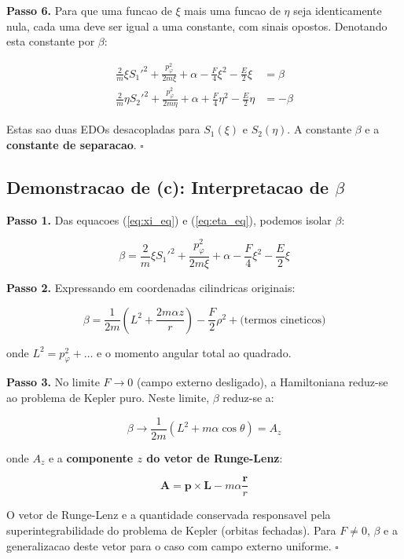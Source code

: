 \documentclass[12pt,a4paper,oneside]{article}
\begin{document}
\textbf{Passo 6.} Para que uma funcao de $\xi$ mais uma funcao de $\eta$
seja identicamente nula, cada uma deve ser igual a uma constante, com
sinais opostos. Denotando esta constante por $\beta$:

\begin{align}
\frac{2}{m}\xi S_1'^2 + \frac{p_\varphi^2}{2m\xi} + \alpha -
\frac{F}{4}\xi^2 - \frac{E}{2}\xi &= \beta \label{eq:xi_eq} \\
\frac{2}{m}\eta S_2'^2 + \frac{p_\varphi^2}{2m\eta} + \alpha +
\frac{F}{4}\eta^2 - \frac{E}{2}\eta &= -\beta \label{eq:eta_eq}
\end{align}

Estas sao duas EDOs desacopladas para $S_1(\xi)$ e $S_2(\eta)$. A constante
$\beta$ e a \textbf{constante de separacao}. $\square$

\subsection*{Demonstracao de (c): Interpretacao de $\beta$}

\textbf{Passo 1.} Das equacoes (\ref{eq:xi_eq}) e (\ref{eq:eta_eq}), podemos
isolar $\beta$:

$$\beta = \frac{2}{m}\xi S_1'^2 + \frac{p_\varphi^2}{2m\xi} + \alpha -
\frac{F}{4}\xi^2 - \frac{E}{2}\xi$$

\textbf{Passo 2.} Expressando em coordenadas cilindricas originais:

$$\beta = \frac{1}{2m}\left(L^2 + \frac{2m\alpha z}{r}\right) -
\frac{F}{2}\rho^2 + \text{(termos cineticos)}$$

onde $L^2 = p_\varphi^2 + \ldots$ e o momento angular total ao quadrado.

\textbf{Passo 3.} No limite $F \to 0$ (campo externo desligado), a
Hamiltoniana reduz-se ao problema de Kepler puro. Neste limite, $\beta$
reduz-se a:

$$\beta \to \frac{1}{2m}(L^2 + m\alpha\cos\theta) = A_z$$

onde $A_z$ e a \textbf{componente $z$ do vetor de Runge-Lenz}:

$$\mathbf{A} = \mathbf{p} \times \mathbf{L} - m\alpha\frac{\mathbf{r}}{r}$$

O vetor de Runge-Lenz e a quantidade conservada responsavel pela
superintegrabilidade do problema de Kepler (orbitas fechadas). Para
$F \neq 0$, $\beta$ e a generalizacao deste vetor para o caso com
campo externo uniforme. $\square$

\newpage
\end{document}
